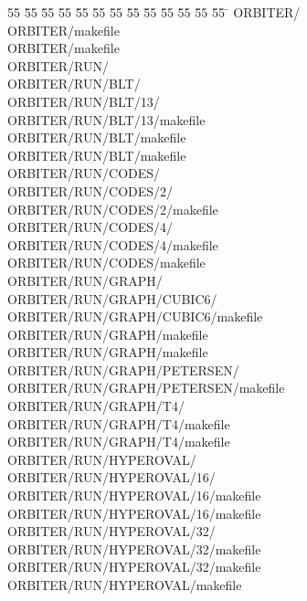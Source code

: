 %
%
\begin{tabbing}
55 \= 55 \= 55 \= 55 \= 55 \= 55 \= 55 \= 55 \= 55 \= 55 \= 55 \= 55 \= 55 \= \kill
ORBITER/\\[0pt]
ORBITER/makefile\\[0pt]
ORBITER/makefile\\[0pt]
ORBITER/RUN/\\[0pt]
ORBITER/RUN/BLT/\\[0pt]
ORBITER/RUN/BLT/13/\\[0pt]
ORBITER/RUN/BLT/13/makefile\\[0pt]
ORBITER/RUN/BLT/makefile\\[0pt]
ORBITER/RUN/BLT/makefile\\[0pt]
ORBITER/RUN/CODES/\\[0pt]
ORBITER/RUN/CODES/2/\\[0pt]
ORBITER/RUN/CODES/2/makefile\\[0pt]
ORBITER/RUN/CODES/4/\\[0pt]
ORBITER/RUN/CODES/4/makefile\\[0pt]
ORBITER/RUN/CODES/makefile\\[0pt]
ORBITER/RUN/GRAPH/\\[0pt]
ORBITER/RUN/GRAPH/CUBIC6/\\[0pt]
ORBITER/RUN/GRAPH/CUBIC6/makefile\\[0pt]
ORBITER/RUN/GRAPH/makefile\\[0pt]
ORBITER/RUN/GRAPH/makefile\\[0pt]
ORBITER/RUN/GRAPH/PETERSEN/\\[0pt]
ORBITER/RUN/GRAPH/PETERSEN/makefile\\[0pt]
ORBITER/RUN/GRAPH/T4/\\[0pt]
ORBITER/RUN/GRAPH/T4/makefile\\[0pt]
ORBITER/RUN/GRAPH/T4/makefile\\[0pt]
ORBITER/RUN/HYPEROVAL/\\[0pt]
ORBITER/RUN/HYPEROVAL/16/\\[0pt]
ORBITER/RUN/HYPEROVAL/16/makefile\\[0pt]
ORBITER/RUN/HYPEROVAL/16/makefile\\[0pt]
ORBITER/RUN/HYPEROVAL/32/\\[0pt]
ORBITER/RUN/HYPEROVAL/32/makefile\\[0pt]
ORBITER/RUN/HYPEROVAL/32/makefile\\[0pt]
ORBITER/RUN/HYPEROVAL/makefile\\[0pt]

\end{tabbing}
